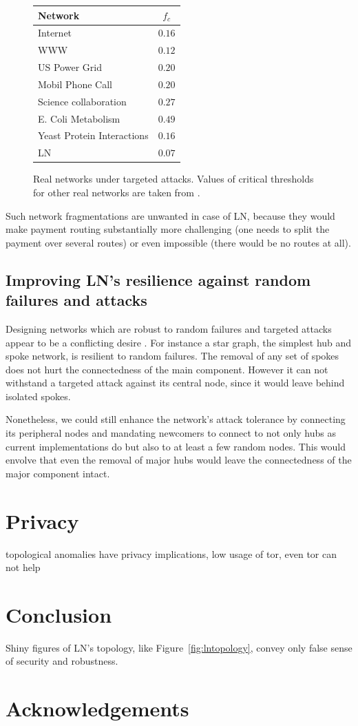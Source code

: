 \documentclass[a4paper]{article}
\theoremstyle{definition}
\begin{document}
\begin{figure}
	\begin{tabular}{ | l | c | }
		\hline
		Network & $f_c$  \\ \hline
		Internet & $0.16$  \\ \hline
		WWW & $0.12$ \\ \hline
		US Power Grid & $0.20$  \\ \hline
		Mobil Phone Call & $0.20$ \\ \hline
		Science collaboration& $0.27$ \\ \hline
		E. Coli Metabolism & $0.49$ \\ \hline
		Yeast Protein Interactions & $0.16$ \\ \hline
		LN & $0.07$ \\ \hline
	\end{tabular}
	\caption{Real networks under targeted attacks. Values of critical thresholds for other real networks are taken from \cite{barabasi2016network}.}\label{fig:randfailures}
\end{figure}

Such network fragmentations are unwanted in case of LN, because they would make payment routing substantially more challenging (one needs to split the payment over several routes) or even impossible (there would be no routes at all).

\subsection{Improving LN's resilience against random failures and attacks}
Designing networks which are robust to random failures and targeted attacks appear to be a conflicting desire \cite{barabasi2016network}. For instance a star graph, the simplest hub and spoke network, is resilient to random failures. The removal of any set of spokes does not hurt the connectedness of the main component. However it can not withstand a targeted attack against its central node, since it would leave behind isolated spokes. 

Nonetheless, we could still enhance the network's attack tolerance by connecting its peripheral nodes \cite{barabasi2016network} and
mandating newcomers to connect to not only hubs as current implementations do but also to at least a few random nodes. This would envolve that even the removal of major hubs would leave the connectedness of the major component intact.
\section{Privacy}
topological anomalies have privacy implications, low usage of tor, even tor can not help
\section{Conclusion}
Shiny figures of LN's topology, like Figure~\ref{fig:lntopology}, convey only false sense of security and robustness.
\section{Acknowledgements}



\end{document}
